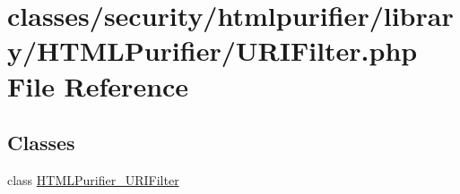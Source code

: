 \hypertarget{URIFilter_8php}{\section{classes/security/htmlpurifier/library/\+H\+T\+M\+L\+Purifier/\+U\+R\+I\+Filter.php File Reference}
\label{URIFilter_8php}
}
\subsection*{Classes}
\begin{DoxyCompactItemize}
\item 
class \hyperlink{classHTMLPurifier__URIFilter}{H\+T\+M\+L\+Purifier\+\_\+\+U\+R\+I\+Filter}
\end{DoxyCompactItemize}
